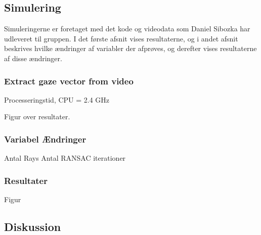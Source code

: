 \documentclass[rapport.tex]{subfiles}
\begin{document}
	\subsection{Simulering}
	
	Simuleringerne er foretaget med det kode og videodata som Daniel Sibozka har udleveret til gruppen. I det første afsnit vises resultaterne, og i andet afsnit beskrives hvilke ændringer af variabler der afprøves, og derefter vises resultaterne af disse ændringer.
	
	\subsubsection{Extract gaze vector from video}
	
	Processeringstid, CPU = 2.4 GHz
	
	Figur over resultater.
	
	\subsubsection{Variabel Ændringer}
	
	Antal Rays
	Antal RANSAC iterationer
	
	
	\subsubsection{Resultater}
	
	Figur 
	\subsection{Diskussion}
		
\end{document}
